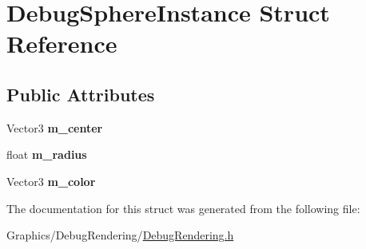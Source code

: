 \hypertarget{structDebugSphereInstance}{}\section{Debug\+Sphere\+Instance Struct Reference}
\label{structDebugSphereInstance}
\subsection*{Public Attributes}
\begin{DoxyCompactItemize}
\item 
\mbox{\label{structDebugSphereInstance_af998ca53b90737be1b18db99e7f09da9}} 
Vector3 {\bfseries m\+\_\+center}
\item 
\mbox{\label{structDebugSphereInstance_afde262deb97af3cb282f3d917daad640}} 
float {\bfseries m\+\_\+radius}
\item 
\mbox{\label{structDebugSphereInstance_a3dce51f10875fe29d06b56a5353da2d5}} 
Vector3 {\bfseries m\+\_\+color}
\end{DoxyCompactItemize}


The documentation for this struct was generated from the following file\+:\begin{DoxyCompactItemize}
\item 
Graphics/\+Debug\+Rendering/\hyperlink{DebugRendering_8h}{Debug\+Rendering.\+h}\end{DoxyCompactItemize}
